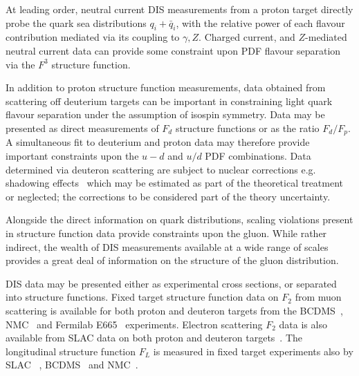 At leading order, neutral current DIS measurements from a proton target directly probe the quark sea distributions $q_i+\bar{q}_i$, with the relative power of each flavour contribution mediated via its coupling to $\gamma,Z$. Charged current, and $Z$-mediated neutral current data can provide some constraint upon PDF flavour separation via the $F^3$ structure function. 

In addition to proton structure function measurements, data obtained from scattering off deuterium targets can be important in constraining light quark flavour separation under the assumption of isospin symmetry. Data may be presented as direct measurements of $F_d$ structure functions or as the ratio $F_d/F_p$. A simultaneous fit to deuterium and proton data may therefore provide important constraints upon the $u-d$ and $u/d$ PDF combinations. Data determined via deuteron scattering are subject to nuclear corrections e.g. shadowing effects~\cite{Badelek:1994qg} which may be estimated as part of the theoretical treatment or neglected; the corrections to be considered part of the theory uncertainty.

Alongside the direct information on quark distributions, scaling violations present in structure function data provide constraints upon the gluon. While rather indirect, the wealth of DIS measurements available at a wide range of scales provides a great deal of information on the structure of the gluon distribution.

DIS data may be presented either as experimental cross sections, or separated into structure functions. Fixed target structure function data on $F_2$ from muon scattering is available for both proton and deuteron targets from the BCDMS~\cite{Benvenuti:1989rh,Benvenuti:1989fm}, NMC~\cite{Arneodo:1996qe,Arneodo:1996kd} and Fermilab E665~\cite{Adams:1996gu} experiments. Electron scattering $F_2$ data is also available from SLAC data on both proton and deuteron targets~\cite{Whitlow:1991uw}. The longitudinal structure function $F_L$ is measured in fixed target experiments also by SLAC~\cite{Whitlow:1990gk} , BCDMS~\cite{Benvenuti:1989rh} and NMC~\cite{Arneodo:1996qe}. 


